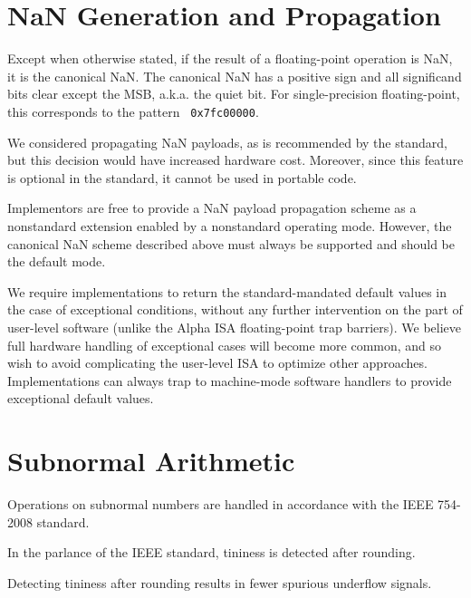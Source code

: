 \section{NaN Generation and Propagation}

Except when otherwise stated, if the result of a floating-point operation is
NaN, it is the canonical NaN.  The canonical NaN has a positive sign and all
significand bits clear except the MSB, a.k.a. the quiet bit.  For
single-precision floating-point, this corresponds to the pattern {\tt
0x7fc00000}.

\begin{commentary}
We considered propagating NaN payloads, as is recommended by the standard,
but this decision would have increased hardware cost.  Moreover, since this
feature is optional in the standard, it cannot be used in portable code.

Implementors are free to provide a NaN payload propagation scheme as
a nonstandard extension enabled by a nonstandard operating mode.  However, the
canonical NaN scheme described above must always be supported and should be
the default mode.
\end{commentary}

\begin{commentary}
We require implementations to return the standard-mandated default
values in the case of exceptional conditions, without any further
intervention on the part of user-level software (unlike the Alpha ISA
floating-point trap barriers).  We believe full hardware handling of
exceptional cases will become more common, and so wish to avoid
complicating the user-level ISA to optimize other approaches.
Implementations can always trap to machine-mode software handlers to
provide exceptional default values.
\end{commentary}

\section{Subnormal Arithmetic}

Operations on subnormal numbers are handled in accordance with the IEEE
754-2008 standard.

In the parlance of the IEEE standard, tininess is detected after rounding.

\begin{commentary}
Detecting tininess after rounding results in fewer spurious underflow signals.
\end{commentary}

